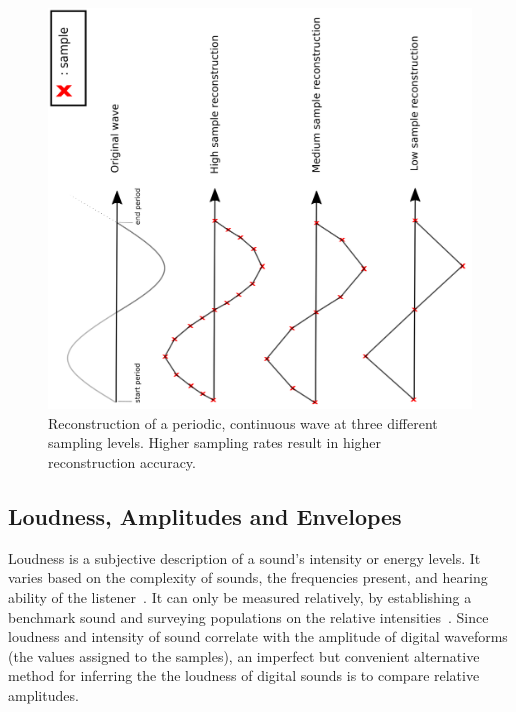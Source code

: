 \documentclass[\main/thesis.tex]{subfiles}
\begin{document}
\begin{figure}[h]

\centering
\includegraphics[width=1\linewidth,angle =-90 ]{images/periodic_function_decimation.png}
\caption{Reconstruction of a periodic, continuous wave at three different sampling levels. Higher sampling rates result in higher reconstruction accuracy. } %
\label{fig_sampling_rate}
\end{figure}


\subsection{Loudness, Amplitudes and Envelopes}
Loudness is a subjective description of a sound's intensity or energy levels. It varies based on the complexity of sounds, the frequencies present, and hearing ability of the listener~\cite{fletcher1933loudness,cook1999chap6}. It can only be measured relatively, by establishing a benchmark sound and surveying populations on the relative intensities~\cite{cook1999chap6}. Since loudness and intensity of sound correlate with the amplitude of digital waveforms (the values assigned to the samples), an imperfect but convenient alternative method for inferring the the loudness of digital sounds is to compare relative amplitudes. 
\end{document}
